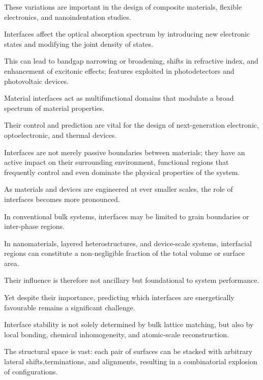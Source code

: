 These variations are important in the design of composite materials, flexible electronics, and nanoindentation studies.

\label{para:interface_optical_effects} %

Interfaces affect the optical absorption spectrum by introducing new electronic states and modifying the joint density
of states.

This can lead to bandgap narrowing or broadening, shifts in refractive index, and enhancement of excitonic effects;
features exploited in photodetectors and photovoltaic devices.

\label{para:interface_summary} %

Material interfaces act as multifunctional domains that modulate a broad spectrum of material
properties.

Their control and prediction are vital for the design of next-generation electronic, optoelectronic, and thermal
devices.

\label{para:interface_functional_regions} %

Interfaces are not merely passive boundaries between materials; they have an active impact on their surrounding
environment, functional regions that frequently control and even dominate the physical properties of the system.

As materials and devices are engineered at ever smaller scales, the role of interfaces becomes more pronounced.

In conventional bulk systems, interfaces may be limited to grain boundaries or inter-phase regions.

In nanomaterials, layered heterostructures, and device-scale systems, interfacial regions can constitute a
non-negligible fraction of the total volume or surface area.

Their influence is therefore not ancillary but foundational to system performance.

\label{para:interface_stability_challenge} %

Yet despite their importance, predicting which interfaces are energetically favourable remains a significant challenge.

Interface stability is not solely determined by bulk lattice matching, but also by local bonding, chemical
inhomogeneity, and atomic-scale reconstruction.

The structural space is vast: each pair of surfaces can be stacked with arbitrary lateral shifts,terminations, and
alignments, resulting in a combinatorial explosion of configurations.

